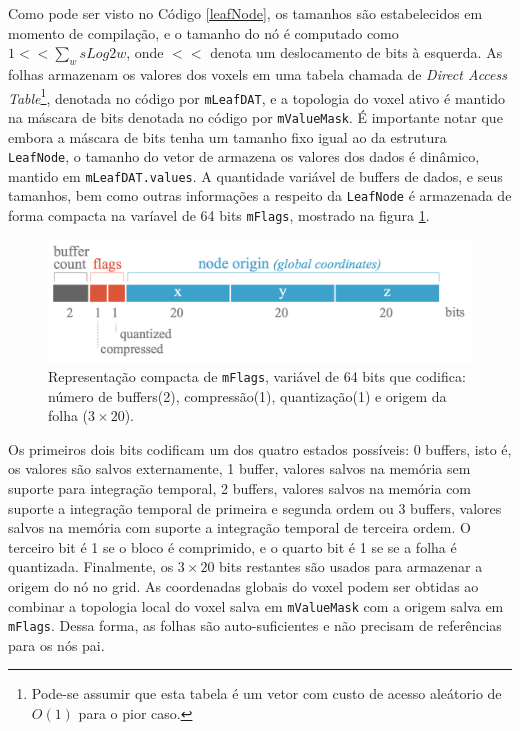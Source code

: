 \documentclass[12pt, a4paper, oneside]{book}
\begin{document}
Como pode ser visto no Código \ref{leafNode}, os tamanhos são estabelecidos em momento de compilação, e o tamanho do nó é computado como $1 << \sum_{w} sLog2w$, onde $<<$ denota um deslocamento de bits à esquerda. As folhas armazenam os valores dos voxels em uma tabela chamada de {\it Direct Access Table}\footnote{Pode-se assumir que esta tabela é um vetor com custo de acesso aleátorio de $O(1)$ para o pior caso.}, denotada no código por \texttt{mLeafDAT}, e a topologia do voxel ativo é mantido na máscara de bits denotada no código por \texttt{mValueMask}. É importante notar que embora a máscara de bits tenha um tamanho fixo igual ao da estrutura \texttt{LeafNode}, o tamanho do vetor de armazena os valores dos dados é dinâmico, mantido em \texttt{mLeafDAT.values}. A quantidade variável de buffers de dados, e seus tamanhos, bem como outras informações a respeito da \texttt{LeafNode} é armazenada de forma compacta na varíavel de 64 bits \texttt{mFlags}, mostrado na figura \ref{mFlags}.

\begin{figure}[!htb]
\center
\includegraphics[width=12cm]{mFlags}
\caption{Representação compacta de \texttt{mFlags}, variável de 64 bits que codifica: número de buffers(2), compressão(1), quantização(1) e origem da folha ($3 \times 20$).}
\label{mFlags}
\end{figure}

Os primeiros dois bits codificam um dos quatro estados possíveis: 0 buffers, isto é, os valores são salvos externamente, 1 buffer, valores salvos na memória sem suporte para integração temporal, 2 buffers, valores salvos na memória com suporte a integração temporal de primeira e segunda ordem ou 3 buffers, valores salvos na memória com suporte a integração temporal de terceira ordem. O terceiro bit é 1 se o bloco é comprimido, e o quarto bit é 1 se se a folha é quantizada. Finalmente, os $3 \times 20$ bits restantes são usados para armazenar a origem do nó no grid. As coordenadas globais do voxel podem ser obtidas ao combinar a topologia local do voxel salva em \texttt{mValueMask} com a origem salva em \texttt{mFlags}. Dessa forma, as folhas são auto-suficientes e não precisam de referências para os nós pai. \\
\end{document}
